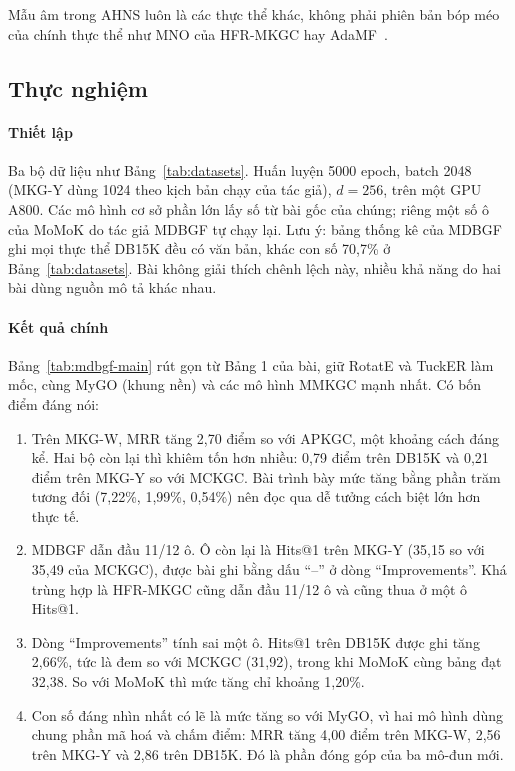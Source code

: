 \documentclass[conference,a4paper]{IEEEtran}
\begin{document}
Mẫu âm trong AHNS luôn là các thực thể khác, không phải phiên bản bóp méo của chính thực thể như MNO của HFR-MKGC hay AdaMF~\cite{adamf}.

\subsection{Thực nghiệm}
\label{sec:mdbgf-exp}

\paragraph{Thiết lập} Ba bộ dữ liệu như Bảng~\ref{tab:datasets}. Huấn luyện 5000 epoch, batch 2048 (MKG-Y dùng 1024 theo kịch bản chạy của tác giả), $d = 256$, trên một GPU A800. Các mô hình cơ sở phần lớn lấy số từ bài gốc của chúng; riêng một số ô của MoMoK do tác giả MDBGF tự chạy lại. Lưu ý: bảng thống kê của MDBGF ghi mọi thực thể DB15K đều có văn bản, khác con số 70{,}7\% ở Bảng~\ref{tab:datasets}. Bài không giải thích chênh lệch này, nhiều khả năng do hai bài dùng nguồn mô tả khác nhau.

\paragraph{Kết quả chính} Bảng~\ref{tab:mdbgf-main} rút gọn từ Bảng 1 của bài, giữ RotatE và TuckER làm mốc, cùng MyGO (khung nền) và các mô hình MMKGC mạnh nhất. Có bốn điểm đáng nói:

\begin{enumerate}
\item Trên MKG-W, MRR tăng 2{,}70 điểm so với APKGC, một khoảng cách đáng kể. Hai bộ còn lại thì khiêm tốn hơn nhiều: 0{,}79 điểm trên DB15K và 0{,}21 điểm trên MKG-Y so với MCKGC. Bài trình bày mức tăng bằng phần trăm tương đối (7{,}22\%, 1{,}99\%, 0{,}54\%) nên đọc qua dễ tưởng cách biệt lớn hơn thực tế.
\item MDBGF dẫn đầu 11/12 ô. Ô còn lại là Hits@1 trên MKG-Y (35{,}15 so với 35{,}49 của MCKGC), được bài ghi bằng dấu ``--'' ở dòng ``Improvements''. Khá trùng hợp là HFR-MKGC cũng dẫn đầu 11/12 ô và cũng thua ở một ô Hits@1.
\item Dòng ``Improvements'' tính sai một ô. Hits@1 trên DB15K được ghi tăng 2{,}66\%, tức là đem so với MCKGC (31{,}92), trong khi MoMoK cùng bảng đạt 32{,}38. So với MoMoK thì mức tăng chỉ khoảng 1{,}20\%.
\item Con số đáng nhìn nhất có lẽ là mức tăng so với MyGO, vì hai mô hình dùng chung phần mã hoá và chấm điểm: MRR tăng 4{,}00 điểm trên MKG-W, 2{,}56 trên MKG-Y và 2{,}86 trên DB15K. Đó là phần đóng góp của ba mô-đun mới.
\end{enumerate}
\end{document}
